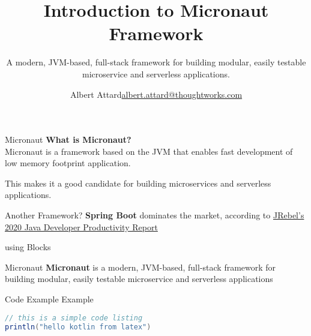 \documentclass{beamer}
\title[Micronaut]{Introduction to Micronaut Framework}
\subtitle{A modern, JVM-based, full-stack framework for building modular, easily testable microservice and serverless applications.}
\author{\texorpdfstring{Albert Attard\newline\url{albert.attard@thoughtworks.com}}{Albert Attard}}
\institute{\large \href{https://thoughtworks.com}{\textbf{ThoughtWorks}.com}}
\date{}
\begin{document}

  \begin{frame}
    \titlepage
  \end{frame}

  \begin{frame}[t]{Micronaut}
    \textbf{What is Micronaut?}\\[6pt]
    Micronaut is a framework based on the JVM that enables fast development of low memory footprint application.

    This makes it a good candidate for building microservices and serverless applications.
  \end{frame}

  \begin{frame}[t]{Another Framework?}
    \textbf{Spring Boot} dominates the market, according to \href{https://www.jrebel.com/sites/rebel/files/pdfs/ebook-jrebel-java-productivity-report.pdf}{JRebel's 2020 Java Developer Productivity Report}


  \end{frame}

  \begin{frame}[t]{using Blocks}
    \begin{block}{Micronaut}
      \textbf{Micronaut} is a modern, JVM-based, full-stack framework for building modular, easily testable microservice and serverless applications
    \end{block}
  \end{frame}

  \begin{frame}[t,fragile]{Code Example}
    Example
    \begin{lstlisting}[language=Java]
// this is a simple code listing
println("hello kotlin from latex")
    \end{lstlisting}
  \end{frame}
\end{document}
